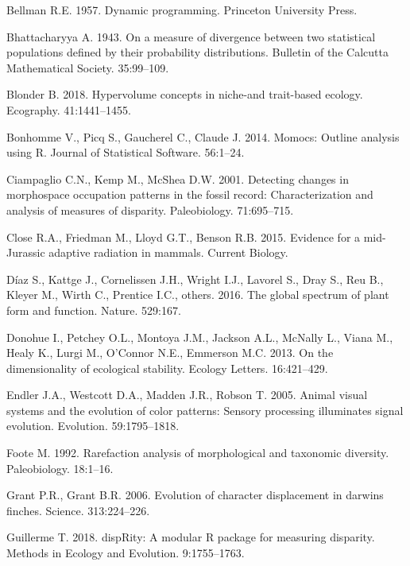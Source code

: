 \documentclass[]{article}
\begin{document}
\hypertarget{ref-cursedimensionality}{}
Bellman R.E. 1957. Dynamic programming. Princeton University Press.

\hypertarget{ref-bhattacharyya1943}{}
Bhattacharyya A. 1943. On a measure of divergence between two
statistical populations defined by their probability distributions.
Bulletin of the Calcutta Mathematical Society. 35:99--109.

\hypertarget{ref-blonder2018}{}
Blonder B. 2018. Hypervolume concepts in niche-and trait-based ecology.
Ecography. 41:1441--1455.

\hypertarget{ref-momocs}{}
Bonhomme V., Picq S., Gaucherel C., Claude J. 2014. Momocs: Outline
analysis using R. Journal of Statistical Software. 56:1--24.

\hypertarget{ref-ciampaglio2001}{}
Ciampaglio C.N., Kemp M., McShea D.W. 2001. Detecting changes in
morphospace occupation patterns in the fossil record: Characterization
and analysis of measures of disparity. Paleobiology. 71:695--715.

\hypertarget{ref-close2015}{}
Close R.A., Friedman M., Lloyd G.T., Benson R.B. 2015. Evidence for a
mid-Jurassic adaptive radiation in mammals. Current Biology.

\hypertarget{ref-diaz2016}{}
Díaz S., Kattge J., Cornelissen J.H., Wright I.J., Lavorel S., Dray S.,
Reu B., Kleyer M., Wirth C., Prentice I.C., others. 2016. The global
spectrum of plant form and function. Nature. 529:167.

\hypertarget{ref-donohue2013}{}
Donohue I., Petchey O.L., Montoya J.M., Jackson A.L., McNally L., Viana
M., Healy K., Lurgi M., O'Connor N.E., Emmerson M.C. 2013. On the
dimensionality of ecological stability. Ecology Letters. 16:421--429.

\hypertarget{ref-endler2005}{}
Endler J.A., Westcott D.A., Madden J.R., Robson T. 2005. Animal visual
systems and the evolution of color patterns: Sensory processing
illuminates signal evolution. Evolution. 59:1795--1818.

\hypertarget{ref-foote1992}{}
Foote M. 1992. Rarefaction analysis of morphological and taxonomic
diversity. Paleobiology. 18:1--16.

\hypertarget{ref-grant2006}{}
Grant P.R., Grant B.R. 2006. Evolution of character displacement in
darwins finches. Science. 313:224--226.

\hypertarget{ref-disprity}{}
Guillerme T. 2018. dispRity: A modular R package for measuring
disparity. Methods in Ecology and Evolution. 9:1755--1763.
\end{document}
